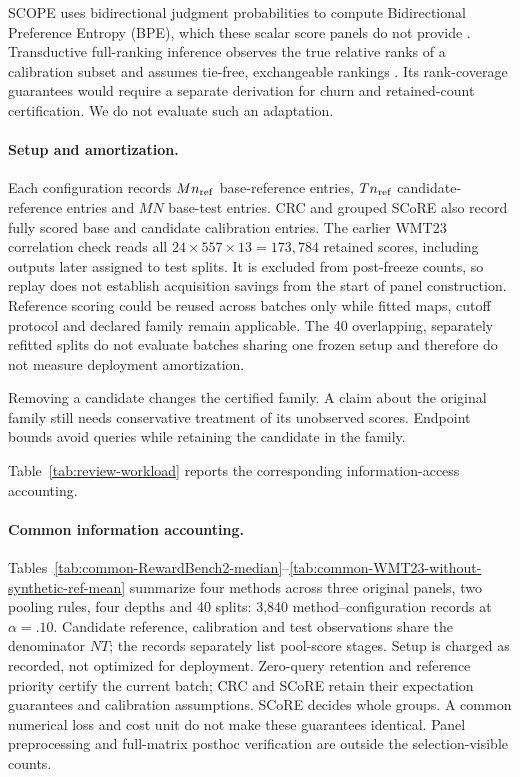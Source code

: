 SCOPE uses bidirectional judgment probabilities to compute Bidirectional Preference Entropy (BPE), which these scalar score panels do not provide \citep{badshah2026scope}. Transductive full-ranking inference observes the true relative ranks of a calibration subset and assumes tie-free, exchangeable rankings \citep{fermanian2025transductive}. Its rank-coverage guarantees would require a separate derivation for churn and retained-count certification. We do not evaluate such an adaptation.

\paragraph{Setup and amortization.}
Each configuration records $Mn_{\rm ref}$ base-reference entries, $Tn_{\rm ref}$ candidate-reference entries and $MN$ base-test entries. CRC and grouped SCoRE also record fully scored base and candidate calibration entries. The earlier WMT23 correlation check reads all $24\times557\times13=173{,}784$ retained scores, including outputs later assigned to test splits. It is excluded from post-freeze counts, so replay does not establish acquisition savings from the start of panel construction. Reference scoring could be reused across batches only while fitted maps, cutoff protocol and declared family remain applicable. The 40 overlapping, separately refitted splits do not evaluate batches sharing one frozen setup and therefore do not measure deployment amortization.

Removing a candidate changes the certified family. A claim about the original family still needs conservative treatment of its unobserved scores. Endpoint bounds avoid queries while retaining the candidate in the family.

Table~\ref{tab:review-workload} reports the corresponding information-access accounting.

\paragraph{Common information accounting.}
Tables~\ref{tab:common-RewardBench2-median}--\ref{tab:common-WMT23-without-synthetic-ref-mean} summarize four methods across three original panels, two pooling rules, four depths and 40 splits: 3,840 method--configuration records at $\alpha=.10$. Candidate reference, calibration and test observations share the denominator $NT$; the records separately list pool-score stages. Setup is charged as recorded, not optimized for deployment. Zero-query retention and reference priority certify the current batch; CRC and SCoRE retain their expectation guarantees and calibration assumptions. SCoRE decides whole groups. A common numerical loss and cost unit do not make these guarantees identical. Panel preprocessing and full-matrix posthoc verification are outside the selection-visible counts.


